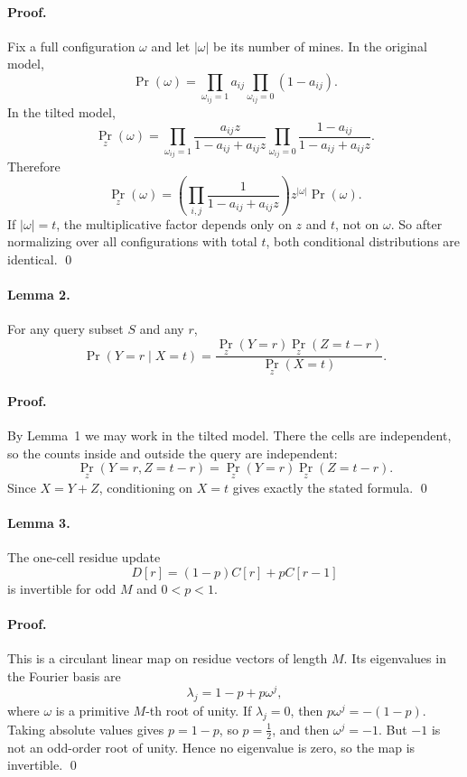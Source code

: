 \documentclass[11pt]{article}
\begin{document}
\paragraph{Proof.}
Fix a full configuration $\omega$ and let $|\omega|$ be its number of mines.
In the original model,
\[
    \Pr(\omega)=\prod_{\omega_{ij}=1} a_{ij}\prod_{\omega_{ij}=0}(1-a_{ij}).
\]
In the tilted model,
\[
    \Pr_z(\omega)=\prod_{\omega_{ij}=1}\frac{a_{ij}z}{1-a_{ij}+a_{ij}z}
    \prod_{\omega_{ij}=0}\frac{1-a_{ij}}{1-a_{ij}+a_{ij}z}.
\]
Therefore
\[
    \Pr_z(\omega)=
    \left(\prod_{i,j}\frac{1}{1-a_{ij}+a_{ij}z}\right)
    z^{|\omega|}\Pr(\omega).
\]
If $|\omega|=t$, the multiplicative factor depends only on $z$ and $t$, not on $\omega$.
So after normalizing over all configurations with total $t$, both conditional distributions are identical. \qed

\paragraph{Lemma 2.}
For any query subset $S$ and any $r$,
\[
    \Pr(Y=r\mid X=t)=\frac{\Pr_z(Y=r)\Pr_z(Z=t-r)}{\Pr_z(X=t)}.
\]

\paragraph{Proof.}
By Lemma~1 we may work in the tilted model.
There the cells are independent, so the counts inside and outside the query are independent:
\[
    \Pr_z(Y=r, Z=t-r)=\Pr_z(Y=r)\Pr_z(Z=t-r).
\]
Since $X=Y+Z$, conditioning on $X=t$ gives exactly the stated formula. \qed

\paragraph{Lemma 3.}
The one-cell residue update
\[
    D[r]=(1-p)C[r]+pC[r-1]
\]
is invertible for odd $M$ and $0<p<1$.

\paragraph{Proof.}
This is a circulant linear map on residue vectors of length $M$.
Its eigenvalues in the Fourier basis are
\[
    \lambda_j=1-p+p\omega^j,
\]
where $\omega$ is a primitive $M$-th root of unity.
If $\lambda_j=0$, then $p\omega^j=-(1-p)$.
Taking absolute values gives $p=1-p$, so $p=\tfrac12$, and then $\omega^j=-1$.
But $-1$ is not an odd-order root of unity.
Hence no eigenvalue is zero, so the map is invertible. \qed
\end{document}
